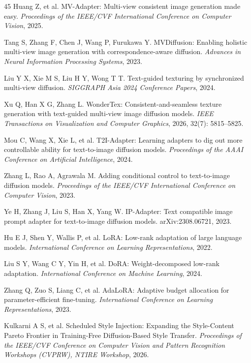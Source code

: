 \documentclass[times,twocolumn,final]{elsarticle}
\providecommand{\DIFadd}[1]{{\protect\color{blue} \sf #1}} %
\providecommand{\DIFaddbegin}{} %
\providecommand{\DIFaddend}{} %
\begin{document}
\begin{thebibliography}{45}
Huang Z, et al. MV-Adapter: Multi-view consistent image generation made easy. \textit{Proceedings of the IEEE/CVF International Conference on Computer Vision}, 2025.

\DIFaddbegin {}
\DIFadd{Tang S, Zhang F, Chen J, Wang P, Furukawa Y. MVDiffusion: Enabling holistic multi-view image generation with correspondence-aware diffusion. \textit{Advances in Neural Information Processing Systems}, 2023.
}

\DIFaddend {}
Liu Y X, Xie M S, Liu H Y, Wong T T. Text-guided texturing by synchronized multi-view diffusion. \textit{SIGGRAPH Asia 2024 Conference Papers}, 2024.

Xu Q, Han X G, Zhang L. WonderTex: Consistent-and-seamless texture generation with text-guided multi-view image diffusion models. \textit{IEEE Transactions on Visualization and Computer Graphics}, 2026, 32(7): 5815--5825.

Mou C, Wang X, Xie L, et al. T2I-Adapter: Learning adapters to dig out more controllable ability for text-to-image diffusion models. \textit{Proceedings of the AAAI Conference on Artificial Intelligence}, 2024.

Zhang L, Rao A, Agrawala M. Adding conditional control to text-to-image diffusion models. \textit{Proceedings of the IEEE/CVF International Conference on Computer Vision}, 2023.

Ye H, Zhang J, Liu S, Han X, Yang W. IP-Adapter: Text compatible image prompt adapter for text-to-image diffusion models. arXiv:2308.06721, 2023.

Hu E J, Shen Y, Wallis P, et al. LoRA: Low-rank adaptation of large language models. \textit{International Conference on Learning Representations}, 2022.

Liu S Y, Wang C Y, Yin H, et al. DoRA: Weight-decomposed low-rank adaptation. \textit{International Conference on Machine Learning}, 2024.

Zhang Q, Zuo S, Liang C, et al. AdaLoRA: Adaptive budget allocation for parameter-efficient fine-tuning. \textit{International Conference on Learning Representations}, 2023.

\DIFaddbegin {}
\DIFadd{Kulkarni A S, et al. Scheduled Style Injection: Expanding the Style-Content Pareto Frontier in Training-Free Diffusion-Based Style Transfer. \textit{Proceedings of the IEEE/CVF Conference on Computer Vision and Pattern Recognition Workshops (CVPRW), NTIRE Workshop}, 2026.
}


\end{thebibliography}
\end{document}
